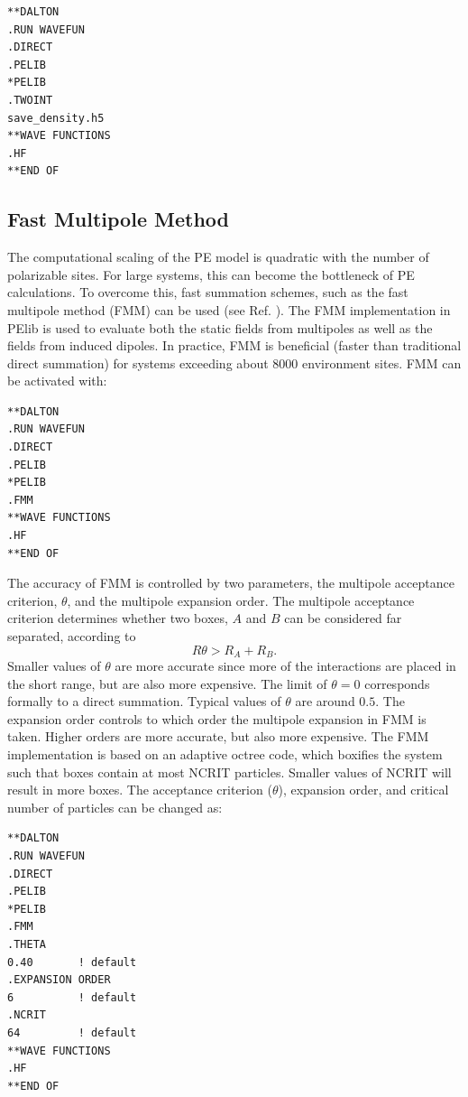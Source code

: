 \begin{verbatim}
**DALTON
.RUN WAVEFUN
.DIRECT
.PELIB
*PELIB
.TWOINT
save_density.h5
**WAVE FUNCTIONS
.HF
**END OF
\end{verbatim}


\subsection{Fast Multipole Method}\label{subsec:FMM}
The computational scaling of the PE model is quadratic with the number of
polarizable sites. For large systems, this can become the bottleneck of PE
calculations. To overcome this, fast summation schemes, such as the fast
multipole method (FMM) can be used (see Ref. ).
The FMM implementation in PElib is used to evaluate both the static fields
from multipoles as well as the fields from induced dipoles. In practice, FMM
is beneficial (faster than traditional direct summation) for systems exceeding
about 8000 environment sites. FMM can be activated with:

\begin{verbatim}
**DALTON
.RUN WAVEFUN
.DIRECT
.PELIB
*PELIB
.FMM
**WAVE FUNCTIONS
.HF
**END OF
\end{verbatim}

The accuracy of FMM is controlled by two parameters, the multipole acceptance criterion, $\theta$,
and the multipole expansion order. The multipole acceptance criterion determines whether two
boxes, $A$ and $B$ can be considered far separated, according to
\begin{equation}
R\theta > R_A + R_B.
\end{equation}
Smaller values of $\theta$ are more accurate since more of the interactions are placed in the
short range, but are also more expensive. The limit of $\theta=0$ corresponds formally to a
direct summation. Typical values of $\theta$ are around $0.5$. The expansion order controls
to which order the multipole expansion in FMM is taken. Higher orders are more accurate, but
also more expensive. The FMM implementation is based on an adaptive octree code, which
boxifies the system such that boxes contain at most NCRIT particles. Smaller values of NCRIT
will result in more boxes. The acceptance criterion ($\theta$), expansion order, and critical
number of particles can be changed as:

\begin{verbatim}
**DALTON
.RUN WAVEFUN
.DIRECT
.PELIB
*PELIB
.FMM
.THETA
0.40       ! default
.EXPANSION ORDER
6          ! default
.NCRIT
64         ! default
**WAVE FUNCTIONS
.HF
**END OF
\end{verbatim}

